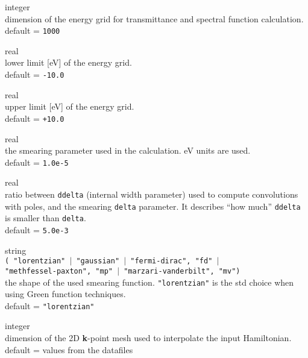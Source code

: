 {\noindent{}%
{\sc integer} \\ dimension of the energy grid for transmittance and spectral function
            calculation.\\
{\sc default} = {\tt 1000}\par

\noindent{}%
{\sc real} \\ lower limit [eV] of the energy grid. \\
{\sc default} = {\tt -10.0} \par

\noindent{}%
{\sc real} \\ upper limit [eV] of the energy grid. \\
{\sc default} = {\tt +10.0} \par

\noindent{}%
{\sc real} \\ the smearing parameter used in the calculation. eV units are used. \\
{\sc default} = {\tt 1.0e-5} \par

\noindent{}%
{\sc real} \\ ratio between {\tt ddelta} (internal width parameter) used to compute 
            convolutions with poles, and the smearing {\tt delta} parameter. 
            It describes ``how much'' {\tt ddelta} is smaller than {\tt delta}. \\
{\sc default} = {\tt 5.0e-3} \par

\noindent{}%
{\sc string} \\ {\tt ( "lorentzian" $\mid$ "gaussian" $\mid$ "fermi-dirac", "fd" $\mid$  \\
                "methfessel-paxton", "mp" $\mid$ "marzari-vanderbilt", "mv") } \\
                the shape of the used smearing function. {\tt "lorentzian"} is the std
                choice when using Green function techniques. \\
{\sc default} = {\tt "lorentzian"} \par

\noindent{}%
{\sc integer} \\ dimension of the 2D \textbf{k}-point mesh used to interpolate the 
                 input Hamiltonian.
{\sc default} = values from the \WANT{} datafiles \par

}
